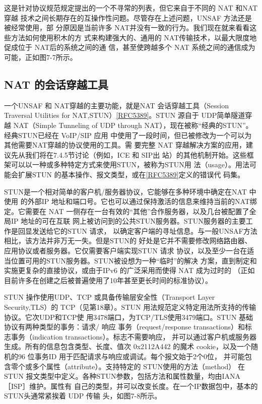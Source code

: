 这是针对协议规范规定提出的一个不寻常的列表，但它来自于不同的 NAT 和NAT 穿越
技术之间长期存在的互操作性问题。尽管存在上述问题，UNSAF 方法还是被经常使用，部
分原因是当前许多 NAT并没有一致的行为。我们现在就来看看这些方法如何使用积木的方
式来构建强大的、通用的 NAT传输技术，以最大限度地促成位于 NAT后的系统之间的通
信，甚至使跨越多个 NAT 系统之间的通信成为可能，正如图7-7所示。

\subsection{NAT 的会话穿越工具}

一个UNSAF 和 NAT穿越的主要功能，就是NAT 会话穿越工具（Session Traversal
Utilities for
NAT,STUN）\href{https://www.rfc-editor.org/rfc/rfc5389}{[RFC5389]}。STUN
源自于 UDP简单隧道穿越 NAT（Simple Tunneling
of UDP through NAT），现在被称“经典的STUN”。经典STUN已经在 VoIP/SIP 应用
中使用了一段时间，但已被修改为一个可以为其他需要NAT穿越的协议使用的工具。需
要完整 NAT 穿越解决方案的应用，建议先从我们将在7.4.5节讨论（例如，ICE 和 SIP出
站）的其他机制开始。这些框架可以以一种或多种特定方式来使用STUN，被称为STUN用
法（usage）。用法可能会扩展STUN
的基本操作、报文类型，或在\href{https://www.rfc-editor.org/rfc/rfc5389}{[RFC5389]}定义的错误代
码集。

STUN是一个相对简单的客户机/服务器协议，它能够在多种环境中确定在NAT 中使用
的外部IP 地址和端口号。它也可以通过保持激活的信息来维持当前的NAT绑定。它需要在
NAT 一侧存在一台有效的“其他”合作服务器，以及几台被配置了全局IP 地址的可在互联
网上被访问到的公共STUN服务器。STUN服务器的主要工作是回显发送给它的STUN 请求，
以确定客户端的寻址信息。与一般UNSAF方法相比，该方法并非万无一失。但是STUN的
好处是它并不需要修改网络路由器、应用协议或者服务器。它仅需要客户端实现STUN 请求
协议，以及至少一台在适当位置可用的STUN服务器。STUN被设想为一种“临时”的解决
方案，直到制定和实施更复杂的直接协议，或由于IPv6 的广泛采用而使得 NAT 成为过时的
（正如目前许多在创建之后被普遍使用了10年甚至更长时间的标准协议）。

STUN 操作使用UDP、TCP 或具备传输层安全性（Transport Layer Security,TLS）的
TCP（见第18章）。STUN 用法规范定义特定用法所支持的传输协议。它次UDP和TCP使
用3478端口，为TCP/TLS使用3479端口。STUN 基础协议有两种类型的事务：请求/ 响应
事务（request/response transactions）和标志事务（indication transactions）。标志不需要响应，
并可以通过客户机或服务器生成。所有的信息包含类型、长度、值次 0x2112A442 的魔术
cookie，以及一个随机的96 位事务ID 用于匹配请求与响应或调试。每个报文始于2个0位，
并可能包含零个或多个属性（attribute）。支持特定的 STUN使用的方法（method） 在 STUN
报文类型中定义。各种STUN参数，包括方法和属性数量，均由IANA［ISP］维护。属性有
自己的类型，并可以改变长度。在一个IP数据包中，基本的STUN头通常紧挨着 UDP 传输
头，如图7-8所示。

